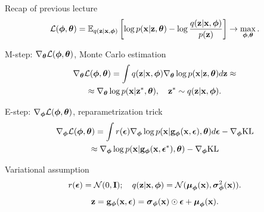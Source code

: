 \begin{frame}{Recap of previous lecture}
	\vspace{-0.3cm}
	\[
		 \mathcal{L} (\bphi, \btheta)  = \mathbb{E}_{q(\bz | \bx, \bphi)} \left[\log p(\bx | \bz, \btheta) - \log \frac{q(\bz | \bx, \bphi)}{p(\bz)} \right] \rightarrow \max_{\bphi, \btheta}.
	\]	
	\vspace{-0.3cm}
	\begin{block}{M-step: $\nabla_{\btheta} \mathcal{L}(\bphi, \btheta)$, Monte Carlo estimation}
		\vspace{-0.8cm}
		\begin{multline*}
			\nabla_{\btheta} \mathcal{L} (\bphi, \btheta)
			= \int q(\bz|\bx, \bphi) \nabla_{\btheta}\log p(\bx|\bz, \btheta) d \bz \approx  \\
			\approx \nabla_{\btheta}\log p(\bx|\bz^*, \btheta), \quad \bz^* \sim q(\bz|\bx, \bphi).
		\end{multline*}
		\vspace{-0.7cm}
	\end{block}
	\begin{block}{E-step: $\nabla_{\bphi} \mathcal{L}(\bphi, \btheta)$, reparametrization trick}
		\vspace{-0.8cm}
		\begin{multline*}
			\nabla_{\bphi} \mathcal{L} (\bphi, \btheta) = \int r(\bepsilon) \nabla_{\bphi} \log p(\bx | \bg_{\bphi}(\bx, \bepsilon), \btheta) d\bepsilon  - \nabla_{\bphi} \text{KL}
			\\ \approx \nabla_{\bphi} \log p(\bx | \bg_{\bphi}(\bx, \bepsilon^*), \btheta)  - \nabla_{\bphi} \text{KL}
		\end{multline*}
		\vspace{-0.5cm}
	\end{block}
	\vspace{-0.5cm}
	
	\begin{block}{Variational assumption}
		\vspace{-0.3cm}
		\[
			r(\bepsilon) = \mathcal{N}(0, \bI); \quad  q(\bz| \bx, \bphi) = \mathcal{N} (\bmu_{\bphi}(\bx), \bsigma^2_{\bphi}(\bx)).
		\]
		\[
			\bz = \bg_{\bphi}(\bx, \bepsilon) = \bsigma_{\bphi}(\bx) \odot \bepsilon + \bmu_{\bphi}(\bx).
		\]
	\end{block}
\end{frame}
